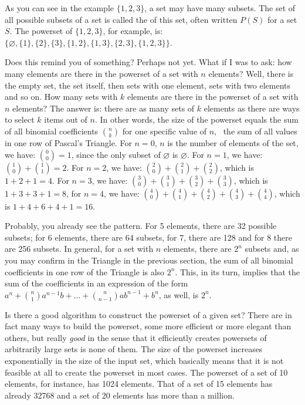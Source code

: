 \documentclass{scrreprt}
\begin{document}
As you can see in the example $\lbrace 1,2,3\rbrace$,
a set may have many subsets.
The set of all possible subsets of a set
is called the  of this set,
often written $P(S)$ for a set $S$.
The powerset of $\lbrace 1,2,3\rbrace$, for example, is:
$\lbrace
\varnothing,
\lbrace 1\rbrace,
\lbrace 2\rbrace,
\lbrace 3\rbrace,
\lbrace 1,2\rbrace,
\lbrace 1,3\rbrace,
\lbrace 2,3\rbrace,
\lbrace 1,2,3\rbrace\rbrace$.

Does this remind you of something?
Perhaps not yet.
What if I was to ask: 
how many elements are there 
in the powerset of a set with $n$ elements?
Well, there is the empty set,
the set itself,
then sets with one element,
sets with two elements
and so on.
How many sets with $k$ elements
are there in the powerset of a set with $n$ elements?
The answer is: 
there are as many sets of $k$ elements
as there are ways to select $k$ items out of $n$.
In other words, 
the size of the powerset equals 
the sum of all binomial coefficients 
$\binom{n}{k}$ for one specific value of $n$,
\ie\ the sum of all values 
in one row of Pascal's Triangle.
For $n=0$, $n$ is the number of elements of the set,
we have: $\binom{0}{0} = 1$,
since the only subset of $\varnothing$ is $\varnothing$.
For $n=1$, we have: $\binom{1}{0} + \binom{1}{1} = 2$.
For $n=2$, we have:
$\binom{2}{0} + \binom{2}{1} + \binom{2}{2}$,
which is $1 + 2 + 1 = 4$.
For $n=3$, we have:
$\binom{3}{0} + \binom{3}{1} + \binom{3}{2} + \binom{3}{3}$,
which is $1 + 3 + 3 + 1 = 8$,
for $n=4$, we have:
$\binom{4}{0} + \binom{4}{1} + \binom{4}{2} + \binom{4}{3} + \binom{4}{4}$,
which is $1 + 4 + 6 + 4 + 1 = 16$.

Probably, you already see  the pattern.
For 5 elements, there are 32 possible subsets;
for 6 elements, there are 64 subsets,
for 7, there are 128 and for 8 there are 256 subsets.
In general,
for a set with $n$ elements,
there are $2^n$ subsets and,
as you may confirm in the Triangle in the previous section,
the sum of all binomial coefficients in one row of the Triangle
is also $2^n$.
This, in its turn, implies that the sum
of the coefficients in an expression of the form 
$a^n + \binom{n}{1}a^{n-1}b + \dots + \binom{n}{n-1}ab^{n-1} + b^n$,
as well, is $2^n$.

Is there a good algorithm 
to construct the powerset of a given set?
There are in fact many ways to build the powerset,
some more efficient or more elegant than others,
but really \emph{good} in the sense
that it efficiently creates powersets
of arbitrarily large sets
is none of them.
The size of the powerset 
increases exponentially in the size
of the input set, which basically means
that it is not feasible at all to 
create the powerset in most cases.
The powerset of a set of 10 elements,
for instance, has \num{1024} elements.
That of a set of 15 elements
has already \num{32768}
and a set of 20 elements has more than a million.
\end{document}
